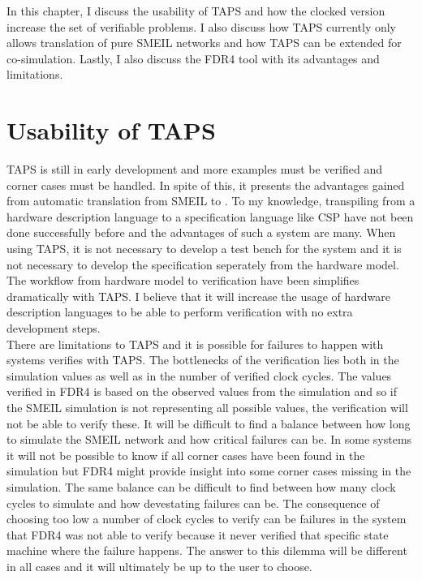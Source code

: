 In this chapter, I discuss the usability of TAPS and how the clocked version increase the set of verifiable problems. I also discuss how TAPS currently only allows translation of pure SMEIL networks and how TAPS can be extended for co-simulation. Lastly, I also discuss the FDR4 tool with its advantages and limitations. 
\section{Usability of TAPS}
TAPS is still in early development and more examples must be verified and corner cases must be handled. In spite of this, it presents the advantages gained from automatic translation from SMEIL to \cspm{}. To my knowledge, transpiling from a hardware description language to a specification language like CSP have not been done successfully before and the advantages of such a system are many. When using TAPS, it is not necessary to develop a test bench for the system and it is not necessary to develop the specification seperately from the hardware model. The workflow from hardware model to verification have been simplifies dramatically with TAPS. I believe that it will increase the usage of hardware description languages to be able to perform verification with no extra development steps. \\

There are limitations to TAPS and it is possible for failures to happen with systems verifies with TAPS. The bottlenecks of the verification lies both in the simulation values as well as in the number of verified clock cycles. The values verified in FDR4 is based on the observed values from the simulation and so if the SMEIL simulation is not representing all possible values, the verification will not be able to verify these. It will be difficult to find a balance between how long to simulate the SMEIL network and how critical failures can be. In some systems it will not be possible to know if all corner cases have been found in the simulation but FDR4 might provide insight into some corner cases missing in the simulation. The same balance can be difficult to find between how many clock cycles to simulate and how devestating failures can be. The consequence of choosing too low a number of clock cycles to verify can be failures in the system that FDR4 was not able to verify because it never verified that specific state machine where the failure happens.
The answer to this dilemma will be different in all cases and it will ultimately be up to the user to choose. \\

